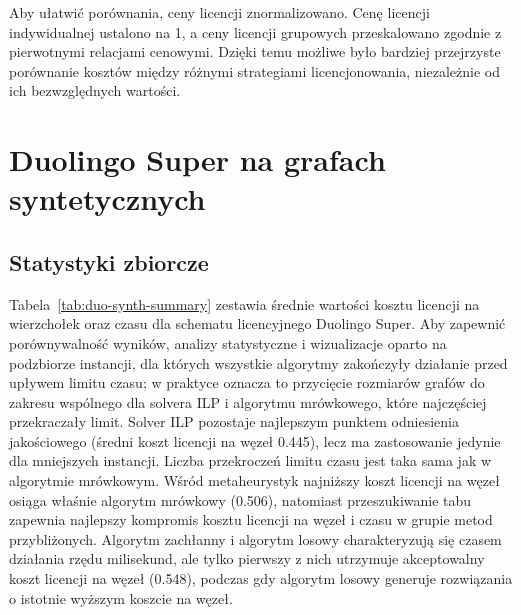 Aby ułatwić porównania, ceny licencji znormalizowano. Cenę licencji indywidualnej ustalono na 1, a ceny licencji grupowych przeskalowano zgodnie z pierwotnymi relacjami cenowymi. Dzięki temu możliwe było bardziej przejrzyste porównanie kosztów między różnymi strategiami licencjonowania, niezależnie od ich bezwzględnych wartości.

\section{Duolingo Super na grafach syntetycznych}

\subsection{Statystyki zbiorcze}
Tabela~\ref{tab:duo-synth-summary} zestawia średnie wartości kosztu licencji na wierzchołek oraz czasu dla schematu licencyjnego Duolingo Super. Aby zapewnić porównywalność wyników, analizy statystyczne i wizualizacje oparto na podzbiorze instancji, dla których wszystkie algorytmy zakończyły działanie przed upływem limitu czasu; w praktyce oznacza to przycięcie rozmiarów grafów do zakresu wspólnego dla solvera ILP i algorytmu mrówkowego, które najczęściej przekraczały limit. Solver ILP pozostaje najlepszym punktem odniesienia jakościowego (średni koszt licencji na węzeł 0.445), lecz ma zastosowanie jedynie dla mniejszych instancji. Liczba przekroczeń limitu czasu jest taka sama jak w algorytmie mrówkowym. Wśród metaheurystyk najniższy koszt licencji na węzeł osiąga właśnie algorytm mrówkowy (0.506), natomiast przeszukiwanie tabu zapewnia najlepszy kompromis kosztu licencji na węzeł i czasu w grupie metod przybliżonych. Algorytm zachłanny i algorytm losowy charakteryzują się czasem działania rzędu milisekund, ale tylko pierwszy z nich utrzymuje akceptowalny koszt licencji na węzeł (0.548), podczas gdy algorytm losowy generuje rozwiązania o istotnie wyższym koszcie na węzeł.

